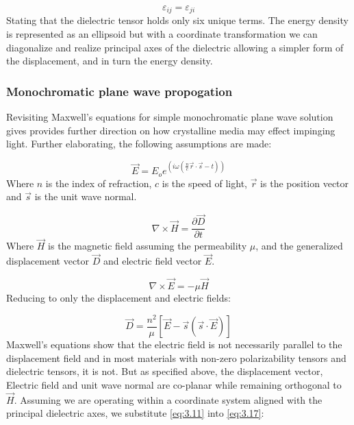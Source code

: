 \begin{equation}
\varepsilon_{ij} = \varepsilon_{ji}
\end{equation}
Stating that the dielectric tensor holds only six unique terms. The energy density is represented as an ellipsoid but with a coordinate transformation we can diagonalize and realize principal axes of the dielectric allowing a simpler form of the displacement, and in turn the energy density.

\subsubsection{Monochromatic plane wave propogation}
Revisiting Maxwell's equations for simple monochromatic plane wave solution gives provides further direction on how crystalline media may effect impinging light. Further elaborating, the following assumptions are made:

\begin{equation}
\vec{E} = E_o e^{(i \omega (\frac{n}{c} \vec{r}\cdot \vec{s}-t))}
\end{equation}
Where $n$ is the index of refraction, $c$ is the speed of light, $\vec{r}$ is the position vector and $\vec{s}$ is the unit wave normal.

\begin{equation}
\nabla \times \vec{H}= \frac{\partial \vec{D}}{\partial t}
\end{equation}
Where $\vec{H}$ is the magnetic field assuming the permeability $\mu$, and the generalized displacement vector $\vec{D}$ and electric field vector $\vec{E}$.

\begin{equation}
\nabla \times \vec{E} = -\mu \vec{H}
\end{equation}
Reducing to only the displacement and electric fields:

\begin{equation}\label{eq:3.17}
\vec{D} = \frac{n^2}{\mu}[\vec{E}-\vec{s}(\vec{s}\cdot \vec{E})]
\end{equation}
Maxwell's equations show that the electric field is not necessarily parallel to the displacement field and in most materials with non-zero polarizability tensors and dielectric tensors, it is not. But as specified above, the displacement vector, Electric field and unit wave normal are co-planar while remaining orthogonal to $\vec{H}$. Assuming we are operating within a coordinate system aligned with the principal dielectric axes, we substitute \ref{eq:3.11} into \ref{eq:3.17}:

